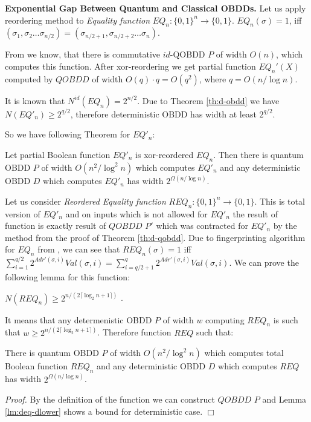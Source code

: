 \documentclass{llncs}
\newcommand{\Beginproof}{{\em Proof.}  }
\newcommand{\Endproof}{\hfill$\Box$\\}
\begin{document}
{\bf Exponential Gap Between Quantum and Classical OBDDs.}
Let us apply reordering method to {\em Equality function} $EQ_n:\{0,1\}^n\to \{0,1\}$. $EQ_n(\sigma)=1$, iff $(\sigma_1,\sigma_2 \ldots \sigma_{n/2})=(\sigma_{n/2+1}, \sigma_{n/2+2} \ldots \sigma_{n})$.

From \cite{akv2008} we know, that there is commutative $id$-QOBDD $P$ of width $O(n)$, which computes this function. After xor-reordering we get partial function $EQ_n'(X)$ computed by $QOBDD$  of width $O(q) \cdot q=O(q^2)$, where $q= O( n/\log{n})$.

It is known that $N^{id}(EQ_n)=2^{n/2}$. Due to Theorem \ref{th:d-obdd} we have $N(EQ'_n)\geq 2^{q/2}$, therefore deterministic OBDD has width at least $2^{q/2}$.

So we have following Theorem for $EQ'_n$:

\begin{theorem}
Let partial Boolean function $EQ'_n$  is xor-reordered $EQ_n$. Then there is quantum OBDD $P$ of width $O(n^2/\log^2 n)$  which computes $EQ'_n$ and any deterministic OBDD $D$  which computes $EQ'_n$ has width  $2^{\Omega(n/\log n)}$.
\end{theorem}

Let us consider {\em Reordered Equality function} $REQ_n:\{0,1\}^n\to \{0,1\}$. This is total version of $EQ'_n$ and on inputs which is not allowed for $EQ'_n$ the result of function is exactly result of $QOBDD$ $P'$ which was contracted for $EQ'_n$ by the method from the proof of Theorem \ref{th:d-qobdd}. Due to fingerprinting algorithm for $EQ_n$ from \cite{akv2008}, we can see that  $REQ_n(\sigma)=1$ iff $\sum_{i=1}^{q/2}2^{Adr'(\sigma,i)}Val(\sigma,i)=\sum_{i=q/2+1}^{q}2^{Adr'(\sigma,i)}Val(\sigma,i)$.
%
We can prove the following lemma for this function: 

\begin{lemma}\label{lm:deq-dlower} $N(REQ_n)\geq 2^{n/(2\lceil \log_2 n +1\rceil)}$ .
\end{lemma}
It means that any determenistic OBDD $P$ of width $w$ computing $REQ_n$ is such that $w\geq 2^{n/(2\lceil \log_2 n + 1\rceil)}$.  
%
Therefore function $REQ$ such that:
\begin{theorem} \label{th:deq}
There is quantum OBDD $P$ of width $O(n^2/\log^2 n)$  which computes total Boolean function $REQ_n$ and any deterministic OBDD $D$  which computes $REQ$ has width  $2^{\Omega(n/\log n)}$.
\end{theorem}
\Beginproof
By the definition of the function we can construct $QOBDD$ $P$ and Lemma \ref{lm:deq-dlower} shows a bound for deterministic case.
\Endproof
\end{document}
